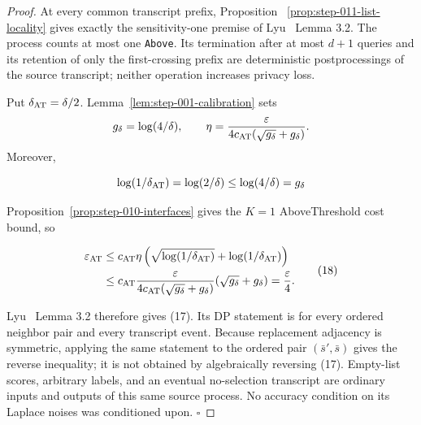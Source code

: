 \begin{proof}
At every common transcript prefix, Proposition
~\ref{prop:step-011-list-locality} gives exactly the sensitivity-one
premise of Lyu~\citep{lyu2025} Lemma 3.2. The process counts at most one \texttt{Above}. Its
termination after at most \(d+1\) queries and its retention of only the
first-crossing prefix are deterministic postprocessings of the source
transcript; neither operation increases privacy loss.

Put \(\delta_{\rm AT}=\delta/2\). Lemma~\ref{lem:step-001-calibration}
sets
\[
g_\delta=\log(4/\delta),
\qquad
\eta=\frac{\varepsilon}
 {4c_{\rm AT}(\sqrt{g_\delta}+g_\delta)}.
\]
Moreover,

\[
 \log(1/\delta_{\rm AT})=\log(2/\delta)
 \leq \log(4/\delta)=g_\delta
\]

Proposition~\ref{prop:step-010-interfaces} gives the \(K=1\)
AboveThreshold cost bound, so

\[
\begin{aligned}
 \varepsilon_{\rm AT}
 &\leq c_{\rm AT}\eta
   \left(\sqrt{\log(1/\delta_{\rm AT})}
         +\log(1/\delta_{\rm AT})\right)\\
 &\leq c_{\rm AT}
   \frac{\varepsilon}
        {4c_{\rm AT}(\sqrt{g_\delta}+g_\delta)}
   (\sqrt{g_\delta}+g_\delta)
 =\frac{\varepsilon}{4}.
\end{aligned}
\tag{18}
\]

Lyu~\citep{lyu2025} Lemma 3.2 therefore gives (17). Its DP statement is for every ordered
neighbor pair and every transcript event. Because replacement adjacency is
symmetric, applying the same statement to the ordered pair
\((\bar s',\bar s)\) gives the reverse inequality; it is not obtained by
algebraically reversing (17). Empty-list scores, arbitrary labels, and an
eventual no-selection transcript are ordinary inputs and outputs of this
same source process. No accuracy condition on its Laplace noises was
conditioned upon. \(\square\)


\end{proof}

